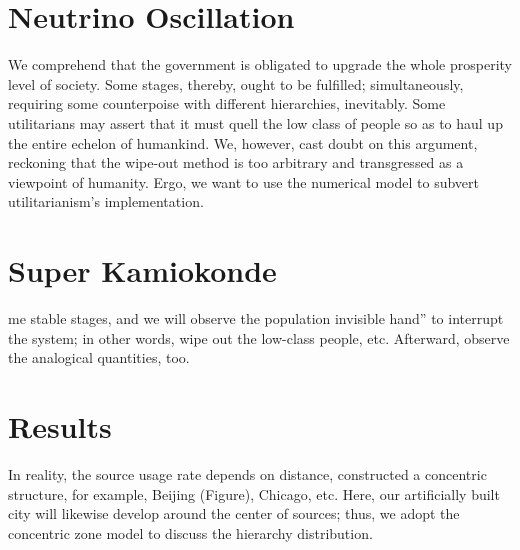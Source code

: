 \documentclass[12pt]{article}
\begin{document}
\setlength{\columnsep}{0.03\textwidth}
\begin{multicols}{2}
    
\section{Neutrino Oscillation}
    We comprehend that the government is obligated to upgrade the whole prosperity level of society. Some stages, thereby, ought to be fulfilled; simultaneously, requiring some counterpoise with different hierarchies, inevitably. Some utilitarians may assert that it must quell the low class of people so as to haul up the entire echelon of humankind. We, however, cast doubt on this argument, reckoning that the wipe-out method is too arbitrary and transgressed as a viewpoint of humanity. Ergo, we want to use the numerical model to subvert utilitarianism's implementation.
    
\section{Super Kamiokonde}
    me stable stages, and we will observe the population invisible hand” to interrupt the system; in other words, wipe out the low-class people, etc. Afterward, observe the analogical quantities, too.


\section{Results}
    In reality, the source usage rate depends on distance, constructed a concentric structure, for example, Beijing (Figure), Chicago, etc. Here, our artificially built city will likewise develop around the center of sources; thus, we adopt the concentric zone model to discuss the hierarchy distribution.
    


\end{multicols}
\end{document}
